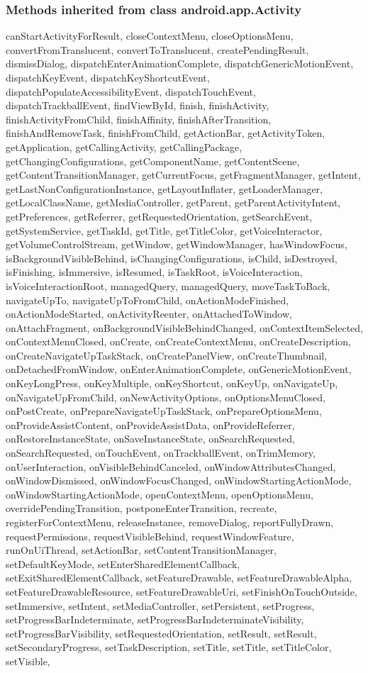 \subsubsection{Methods inherited from class android.app.Activity}

canStartActivityForResult, closeContextMenu, closeOptionsMenu, convertFromTranslucent, convertToTranslucent, createPendingResult, dismissDialog, dispatchEnterAnimationComplete, dispatchGenericMotionEvent, dispatchKeyEvent, dispatchKeyShortcutEvent, dispatchPopulateAccessibilityEvent, dispatchTouchEvent, dispatchTrackballEvent, findViewById, finish, finishActivity, finishActivityFromChild, finishAffinity, finishAfterTransition, finishAndRemoveTask, finishFromChild, getActionBar, getActivityToken, getApplication, getCallingActivity, getCallingPackage, getChangingConfigurations, getComponentName, getContentScene, getContentTransitionManager, getCurrentFocus, getFragmentManager, getIntent, getLastNonConfigurationInstance, getLayoutInflater, getLoaderManager, getLocalClassName, getMediaController, getParent, getParentActivityIntent, getPreferences, getReferrer, getRequestedOrientation, getSearchEvent, getSystemService, getTaskId, getTitle, getTitleColor, getVoiceInteractor, getVolumeControlStream, getWindow, getWindowManager, hasWindowFocus, isBackgroundVisibleBehind, isChangingConfigurations, isChild, isDestroyed, isFinishing, isImmersive, isResumed, isTaskRoot, isVoiceInteraction, isVoiceInteractionRoot, managedQuery, managedQuery, moveTaskToBack, navigateUpTo, navigateUpToFromChild, onActionModeFinished, onActionModeStarted, onActivityReenter, onAttachedToWindow, onAttachFragment, onBackgroundVisibleBehindChanged, onContextItemSelected, onContextMenuClosed, onCreate, onCreateContextMenu, onCreateDescription, onCreateNavigateUpTaskStack, onCreatePanelView, onCreateThumbnail, onDetachedFromWindow, onEnterAnimationComplete, onGenericMotionEvent, onKeyLongPress, onKeyMultiple, onKeyShortcut, onKeyUp, onNavigateUp, onNavigateUpFromChild, onNewActivityOptions, onOptionsMenuClosed, onPostCreate, onPrepareNavigateUpTaskStack, onPrepareOptionsMenu, onProvideAssistContent, onProvideAssistData, onProvideReferrer, onRestoreInstanceState, onSaveInstanceState, onSearchRequested, onSearchRequested, onTouchEvent, onTrackballEvent, onTrimMemory, onUserInteraction, onVisibleBehindCanceled, onWindowAttributesChanged, onWindowDismissed, onWindowFocusChanged, onWindowStartingActionMode, onWindowStartingActionMode, openContextMenu, openOptionsMenu, overridePendingTransition, postponeEnterTransition, recreate, registerForContextMenu, releaseInstance, removeDialog, reportFullyDrawn, requestPermissions, requestVisibleBehind, requestWindowFeature, runOnUiThread, setActionBar, setContentTransitionManager, setDefaultKeyMode, setEnterSharedElementCallback, setExitSharedElementCallback, setFeatureDrawable, setFeatureDrawableAlpha, setFeatureDrawableResource, setFeatureDrawableUri, setFinishOnTouchOutside, setImmersive, setIntent, setMediaController, setPersistent, setProgress, setProgressBarIndeterminate, setProgressBarIndeterminateVisibility, setProgressBarVisibility, setRequestedOrientation, setResult, setResult, setSecondaryProgress, setTaskDescription, setTitle, setTitle, setTitleColor, setVisible, 